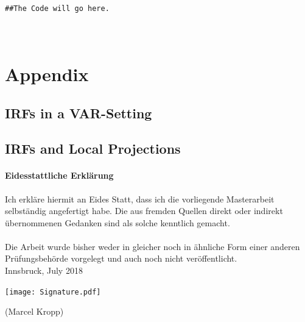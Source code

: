\documentclass[a4paper,12pt,oneside,pointednumbers,numbers=noenddot,bibtotoc,bigheadings,liststotoc,chapterprefix=true]{scrbook}
\renewcommand*{\paragraph}[1]{\subsubsection*{#1} \vspace{-3mm}} %
\begin{document}
\begingroup
\fontsize{10pt}{12pt}\selectfont
\begin{verbatim}  
##The Code will go here.



\end{verbatim}  
\endgroup

\chapter{Appendix}
\section{IRFs in a VAR-Setting}
\section{IRFs and Local Projections}


\nocite{*}
\clearpage
\thispagestyle{empty}







\clearpage
\thispagestyle{empty}
\null\vspace{46pt}
\paragraph{\large{Eidesstattliche Erklärung}}
\vspace{43pt}
Ich erkläre hiermit an Eides Statt, dass ich die vorliegende Masterarbeit selbständig angefertigt habe. Die aus fremden Quellen direkt oder indirekt übernommenen Gedanken sind als solche kenntlich gemacht.\\
\\
Die Arbeit wurde bisher weder in gleicher noch in ähnliche Form einer anderen Prüfungsbehörde vorgelegt und auch noch nicht veröffentlicht.\\[10mm]
Innsbruck, July 2018
\begin{flushright}[htb]
     \texttt{[image: Signature.pdf]}
\end{flushright}
\hspace*{256pt}
(Marcel Kropp)


\end{document}
